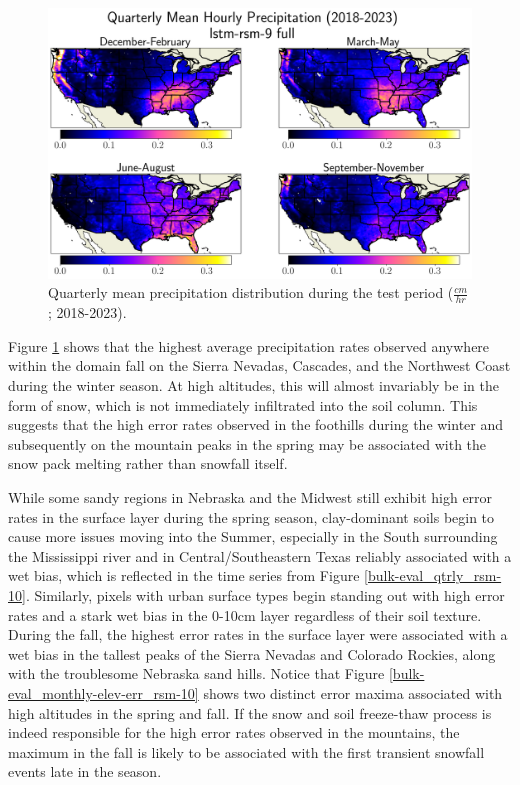 \begin{figure}[h!]
    \centering

    \includegraphics[width=.99\linewidth,draft=false]{figures/grid-eval_qtrly/eval-grid_full_lstm-rsm-9_pixelwise-time-stats_abs-err_qtrly-horizon-apcp.png}

    \caption{Quarterly mean precipitation distribution during the test period ($\frac{cm}{hr}$; 2018-2023).}
    \label{bulk-eval_qtrly-precip}
\end{figure}

Figure \ref{bulk-eval_qtrly-precip} shows that the highest average precipitation rates observed anywhere within the domain fall on the Sierra Nevadas, Cascades, and the Northwest Coast during the winter season. At high altitudes, this will almost invariably be in the form of snow, which is not immediately infiltrated into the soil column. This suggests that the high error rates observed in the foothills during the winter and subsequently on the mountain peaks in the spring may be associated with the snow pack melting rather than snowfall itself.

While some sandy regions in Nebraska and the Midwest still exhibit high error rates in the surface layer during the spring season, clay-dominant soils begin to cause more issues moving into the Summer, especially in the South surrounding the Mississippi river and in Central/Southeastern Texas reliably associated with a wet bias, which is reflected in the time series from Figure \ref{bulk-eval_qtrly_rsm-10}. Similarly, pixels with urban surface types begin standing out with high error rates and a stark wet bias in the 0-10cm layer regardless of their soil texture. During the fall, the highest error rates in the surface layer were associated with a wet bias in the tallest peaks of the Sierra Nevadas and Colorado Rockies, along with the troublesome Nebraska sand hills. Notice that Figure \ref{bulk-eval_monthly-elev-err_rsm-10} shows two distinct error maxima associated with high altitudes in the spring and fall. If the snow and soil freeze-thaw process is indeed responsible for the high error rates observed in the mountains, the maximum in the fall is likely to be associated with the first transient snowfall events late in the season.

